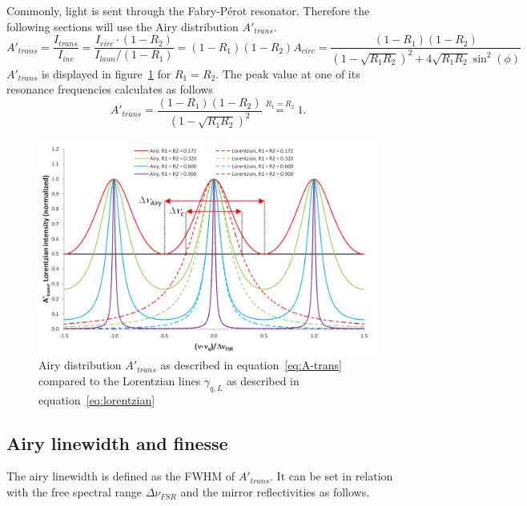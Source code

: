 Commonly, light is sent through the Fabry-Pérot resonator. Therefore the following sections will use the Airy distribution $A'_{trans}$.
\begin{equation}
\label{eq:A-trans}
A'_{trans} = \frac{I_{trans}}{I_{inc}} = \frac{I_{circ} \cdot (1 - R_2)}{I_{laun} / (1 - R_1)} = (1-R_1)(1-R_2)A_{circ} = \frac{(1-R_1)(1-R_2)}{\left(1-\sqrt{R_1R_2}\right)^2+4\sqrt{R_1R_2}\sin^2(\phi)}
\end{equation}
$A'_{trans}$ is displayed in figure~\ref{fig:airydistributionofafabry-perotinterferometer} for $R_1=R_2$. The peak value at one of its resonance frequencies calculates as follows
\begin{equation}
A'_{trans} = \frac{(1-R_1)(1-R_2)}{\left(1-\sqrt{R_1R_2}\right)^2} \stackrel{R_1=R_2}{=} 1. 
\end{equation}

\begin{figure}[h]
	\centering
	\includegraphics[width=0.8\linewidth]{figures/fabry-perot/Airy_distribution_of_a_Fabry-Perot_interferometer}
	\caption[Airy distribution $A'_{trans}$]{Airy distribution $A'_{trans}$ as described in equation~\eqref{eq:A-trans} compared to the Lorentzian lines  $\gamma_{q,L}$ as described in equation~\eqref{eq:lorentzian}}
	\label{fig:airydistributionofafabry-perotinterferometer}
\end{figure}


\subsection{Airy linewidth and finesse}
The airy linewidth is defined as the FWHM of $A'_{trans}$. It can be set in relation with the free spectral range $\Delta \nu_{FSR}$ and the mirror reflectivities as follows.

